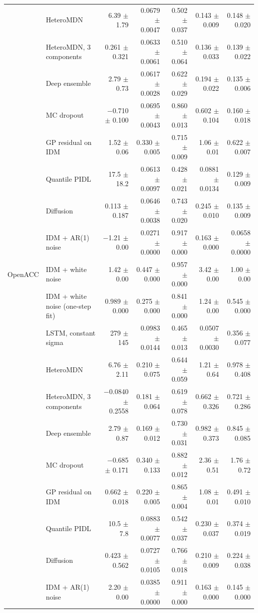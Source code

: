 \begin{longtable}{llrrrrr}
 & HeteroMDN & 6.39 $\pm$ 1.79 & 0.0679 $\pm$ 0.0047 & 0.502 $\pm$ 0.037 & 0.143 $\pm$ 0.009 & 0.148 $\pm$ 0.020 \\
 & HeteroMDN, 3 components & 0.261 $\pm$ 0.321 & 0.0633 $\pm$ 0.0061 & 0.510 $\pm$ 0.064 & 0.136 $\pm$ 0.033 & 0.139 $\pm$ 0.022 \\
 & Deep ensemble & 2.79 $\pm$ 0.73 & 0.0617 $\pm$ 0.0028 & 0.622 $\pm$ 0.029 & 0.194 $\pm$ 0.022 & 0.135 $\pm$ 0.006 \\
 & MC dropout & $-$0.710 $\pm$ 0.100 & 0.0695 $\pm$ 0.0043 & 0.860 $\pm$ 0.013 & 0.602 $\pm$ 0.104 & 0.160 $\pm$ 0.018 \\
 & GP residual on IDM & 1.52 $\pm$ 0.06 & 0.330 $\pm$ 0.005 & 0.715 $\pm$ 0.009 & 1.06 $\pm$ 0.01 & 0.622 $\pm$ 0.007 \\
 & Quantile PIDL & 17.5 $\pm$ 18.2 & 0.0613 $\pm$ 0.0097 & 0.428 $\pm$ 0.021 & 0.0881 $\pm$ 0.0134 & 0.129 $\pm$ 0.009 \\
 & Diffusion & 0.113 $\pm$ 0.187 & 0.0646 $\pm$ 0.0038 & 0.743 $\pm$ 0.020 & 0.245 $\pm$ 0.010 & 0.135 $\pm$ 0.009 \\
 & IDM + AR(1) noise & $-$1.21 $\pm$ 0.00 & 0.0271 $\pm$ 0.0000 & 0.917 $\pm$ 0.000 & 0.163 $\pm$ 0.000 & 0.0658 $\pm$ 0.0000 \\
\midrule
OpenACC & IDM + white noise & 1.42 $\pm$ 0.00 & 0.447 $\pm$ 0.000 & 0.957 $\pm$ 0.000 & 3.42 $\pm$ 0.00 & 1.00 $\pm$ 0.00 \\
 & IDM + white noise (one-step fit) & 0.989 $\pm$ 0.000 & 0.275 $\pm$ 0.000 & 0.841 $\pm$ 0.000 & 1.24 $\pm$ 0.00 & 0.545 $\pm$ 0.000 \\
 & LSTM, constant sigma & 279 $\pm$ 145 & 0.0983 $\pm$ 0.0144 & 0.465 $\pm$ 0.013 & 0.0507 $\pm$ 0.0030 & 0.356 $\pm$ 0.077 \\
 & HeteroMDN & 6.76 $\pm$ 2.11 & 0.210 $\pm$ 0.075 & 0.644 $\pm$ 0.059 & 1.21 $\pm$ 0.64 & 0.978 $\pm$ 0.408 \\
 & HeteroMDN, 3 components & $-$0.0840 $\pm$ 0.2558 & 0.181 $\pm$ 0.064 & 0.619 $\pm$ 0.078 & 0.662 $\pm$ 0.326 & 0.721 $\pm$ 0.286 \\
 & Deep ensemble & 2.79 $\pm$ 0.87 & 0.169 $\pm$ 0.012 & 0.730 $\pm$ 0.031 & 0.982 $\pm$ 0.373 & 0.845 $\pm$ 0.085 \\
 & MC dropout & $-$0.685 $\pm$ 0.171 & 0.340 $\pm$ 0.133 & 0.882 $\pm$ 0.012 & 2.36 $\pm$ 0.51 & 1.76 $\pm$ 0.72 \\
 & GP residual on IDM & 0.662 $\pm$ 0.018 & 0.220 $\pm$ 0.005 & 0.865 $\pm$ 0.004 & 1.08 $\pm$ 0.01 & 0.491 $\pm$ 0.010 \\
 & Quantile PIDL & 10.5 $\pm$ 7.8 & 0.0883 $\pm$ 0.0077 & 0.542 $\pm$ 0.037 & 0.230 $\pm$ 0.037 & 0.374 $\pm$ 0.019 \\
 & Diffusion & 0.423 $\pm$ 0.562 & 0.0727 $\pm$ 0.0105 & 0.766 $\pm$ 0.018 & 0.210 $\pm$ 0.009 & 0.224 $\pm$ 0.038 \\
 & IDM + AR(1) noise & 2.20 $\pm$ 0.00 & 0.0385 $\pm$ 0.0000 & 0.911 $\pm$ 0.000 & 0.163 $\pm$ 0.000 & 0.145 $\pm$ 0.000 \\
\end{longtable}
\endgroup
